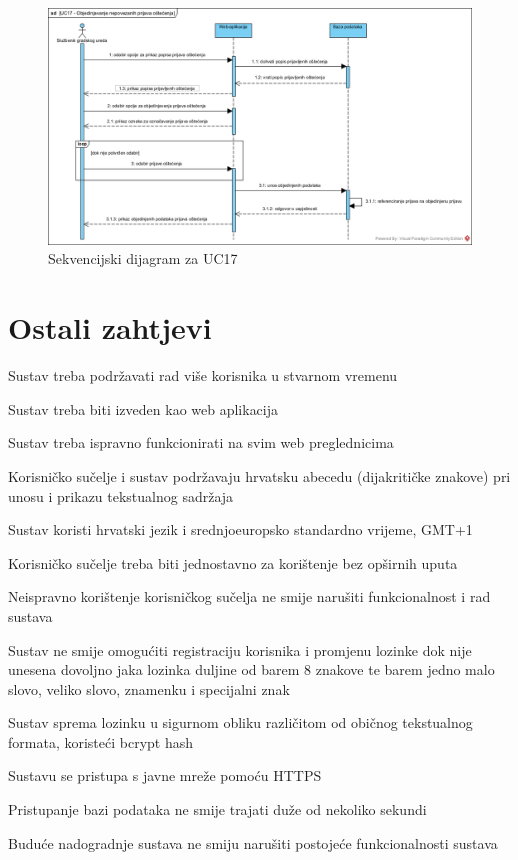 \begin{figure}[H]
	\includegraphics[scale=0.45]{slike/UC17_sekvencijski.jpg} %
	\centering
	\caption{Sekvencijski dijagram za UC17}
	\label{fig:SekvencijskiDijagramObjedinjavanjeNepovezanihPrijavaOštećenja}
\end{figure}

\eject

\section{Ostali zahtjevi}

\begin{packed_enum}
	\item Sustav treba podržavati rad više korisnika u stvarnom vremenu
	\item Sustav treba biti izveden kao web aplikacija
	\item Sustav treba ispravno funkcionirati na svim web preglednicima
	\item Korisničko sučelje i sustav podržavaju hrvatsku abecedu (dijakritičke znakove) pri unosu i prikazu tekstualnog sadržaja
	\item Sustav koristi hrvatski jezik i srednjoeuropsko standardno vrijeme, GMT+1
	\item Korisničko sučelje treba biti jednostavno za korištenje bez opširnih uputa
	\item Neispravno korištenje korisničkog sučelja ne smije narušiti funkcionalnost i rad sustava 
	\item Sustav ne smije omogućiti registraciju korisnika i promjenu lozinke dok nije unesena dovoljno jaka lozinka duljine od barem 8 znakove te barem jedno malo slovo, veliko slovo, znamenku i specijalni znak
	\item Sustav sprema lozinku u sigurnom obliku različitom od običnog tekstualnog formata, koristeći bcrypt hash
	\item Sustavu se pristupa s javne mreže pomoću HTTPS
	\item Pristupanje bazi podataka ne smije trajati duže od nekoliko sekundi
	\item Buduće nadogradnje sustava ne smiju narušiti postojeće funkcionalnosti sustava
\end{packed_enum}

